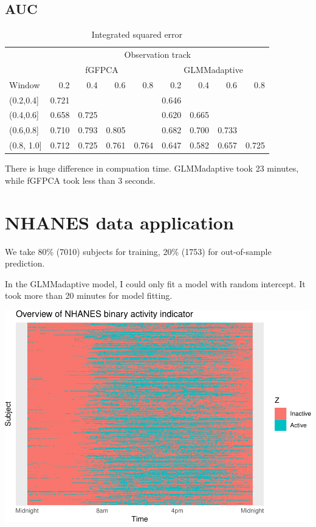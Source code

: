 \documentclass[
]{article}
\begin{document}
\hypertarget{auc-1}{%
\subsection{AUC}\label{auc-1}}

\begin{table}

\caption{\label{tab:unnamed-chunk-9}Integrated squared error}
\centering
\begin{tabular}[t]{l|r|r|r|r|r|r|r|r}
\hline
\multicolumn{1}{c|}{ } & \multicolumn{8}{c}{Observation track} \\
\cline{2-9}
\multicolumn{1}{c|}{ } & \multicolumn{4}{c|}{fGFPCA} & \multicolumn{4}{c}{GLMMadaptive} \\
\cline{2-5} \cline{6-9}
Window & 0.2 & 0.4 & 0.6 & 0.8 & 0.2 & 0.4 & 0.6 & 0.8\\
\hline
(0.2,0.4] & 0.721 &  &  &  & 0.646 &  &  & \\
\hline
(0.4,0.6] & 0.658 & 0.725 &  &  & 0.620 & 0.665 &  & \\
\hline
(0.6,0.8] & 0.710 & 0.793 & 0.805 &  & 0.682 & 0.700 & 0.733 & \\
\hline
(0.8, 1.0] & 0.712 & 0.725 & 0.761 & 0.764 & 0.647 & 0.582 & 0.657 & 0.725\\
\hline
\end{tabular}
\end{table}

There is huge difference in compuation time. GLMMadaptive took 23
minutes, while fGFPCA took less than 3 seconds.

\hypertarget{nhanes-data-application}{%
\section{NHANES data application}\label{nhanes-data-application}}

We take 80\% (7010) subjects for training, 20\% (1753) for out-of-sample
prediction.

In the GLMMadaptive model, I could only fit a model with random
intercept. It took more than 20 minutes for model fitting.

\includegraphics{manuscript_files/figure-latex/nhance_example-1.pdf}
\end{document}
